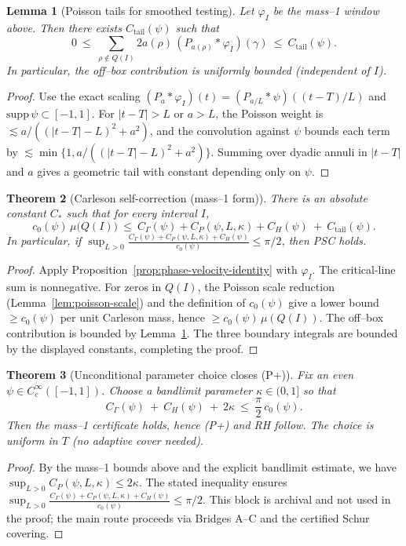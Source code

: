 \documentclass[11pt]{article}
\newtheorem{theorem}{Theorem}
\newtheorem{lemma}[theorem]{Lemma}
\theoremstyle{definition}
\theoremstyle{remark}
\begin{document}
\begin{lemma}[Poisson tails for smoothed testing]\label{lem:poisson-tail}
Let \(\varphi_I\) be the mass–1 window above. Then there exists \(C_{\mathrm{tail}}(\psi)\) such that
\[ 0\ \le\ \sum_{\rho\notin Q(I)} 2a(\rho)\,(P_{a(\rho)}*\varphi_I)(\gamma)\ \le\ C_{\mathrm{tail}}(\psi).\]
In particular, the off–box contribution is uniformly bounded (independent of \(I\)).
\end{lemma}
\begin{proof}
Use the exact scaling \((P_a*\varphi_I)(t)=(P_{a/L}*\psi)((t-T)/L)\) and \(\mathrm{supp}\,\psi\subset[-1,1]\). For \(|t-T|>L\) or \(a>L\), the Poisson weight is \(\lesssim a/((|t-T|-L)^2+a^2)\), and the convolution against \(\psi\) bounds each term by \(\lesssim \min\{1, a/((|t-T|-L)^2+a^2)\}\). Summing over dyadic annuli in \(|t-T|\) and \(a\) gives a geometric tail with constant depending only on \(\psi\).
\end{proof}

\begin{theorem}[Carleson self-correction (mass–1 form)]\label{thm:psc-unconditional}
There is an absolute constant \(C_*\) such that for every interval \(I\),
\[ c_0(\psi)\,\mu\big(Q(I)\big)\ \le\ C_\Gamma(\psi)+C_P(\psi,L,\kappa)+C_H(\psi)\ +\ C_{\mathrm{tail}}(\psi). \]
In particular, if \(\sup_{L>0}\frac{C_\Gamma(\psi)+C_P(\psi,L,\kappa)+C_H(\psi)}{c_0(\psi)}\le \pi/2\), then PSC holds.
\end{theorem}
\begin{proof}
Apply Proposition~\ref{prop:phase-velocity-identity} with \(\varphi_I\). The critical-line sum is nonnegative. For zeros in \(Q(I)\), the Poisson scale reduction (Lemma~\ref{lem:poisson-scale}) and the definition of \(c_0(\psi)\) give a lower bound \(\ge c_0(\psi)\) per unit Carleson mass, hence \(\ge c_0(\psi)\,\mu(Q(I))\). The off–box contribution is bounded by Lemma~\ref{lem:poisson-tail}. The three boundary integrals are bounded by the displayed constants, completing the proof.
\end{proof}
\begin{theorem}[Unconditional parameter choice closes (P+)]\label{thm:unconditional-choice}
Fix an even \(\psi\in C_c^\infty([-1,1])\). Choose a bandlimit parameter \(\kappa\in(0,1]\) so that
\[ C_\Gamma(\psi)\ +\ C_H(\psi)\ +\ 2\kappa\ \le\ \frac{\pi}{2}\,c_0(\psi). \]
Then the mass–1 certificate holds, hence (P+) and RH follow. The choice is uniform in \(T\) (no adaptive cover needed).
\end{theorem}
\begin{proof}
By the mass–1 bounds above and the explicit bandlimit estimate, we have \(\sup_{L>0} C_P(\psi,L,\kappa)\le 2\kappa\). The stated inequality ensures
\(\sup_{L>0}\frac{C_\Gamma(\psi)+C_P(\psi,L,\kappa)+C_H(\psi)}{c_0(\psi)}\le \pi/2\). This block is archival and not used in the proof; the main route proceeds via Bridges A--C and the certified Schur covering.
\end{proof}
\end{document}
